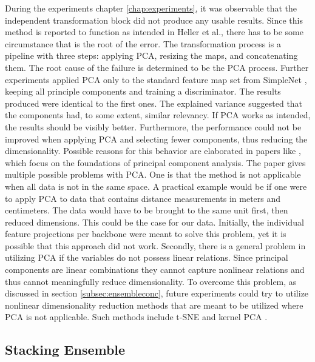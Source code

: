 During the experiments chapter \ref{chap:experiments}, it was observable that the independent transformation block \cite{EnsembleHeller2023} did not produce any usable results. 
Since this method is reported to function as intended in Heller et al., there has to be some circumstance that is the root of the error. The transformation process is a 
pipeline with three steps: applying PCA, resizing the maps, and concatenating them. \newline
The root cause of the failure is determined to be the PCA process. Further experiments applied PCA only to the standard feature map set from SimpleNet \cite{liu2023simplenet}, 
keeping all principle components and training 
a discriminator. The results produced were identical to the first ones. The explained variance suggested that the components had, to some extent, similar relevancy. If PCA 
works as intended, the results should be visibly better. Furthermore, the performance could not be improved when applying PCA and selecting fewer components, thus reducing 
the dimensionality. Possible reasons for this behavior are elaborated in papers like \cite{Jolliffe_2016PCAbasics}, which focus on the foundations of principal component analysis. 
The paper gives multiple possible problems with PCA. One is that the method is not applicable when all data is not in the same space. A practical example would be if one were to 
apply PCA to data that contains distance measurements in meters and centimeters. The data would have to be brought to the same unit first, then reduced dimensions. This could 
be the case for our data. Initially, the individual feature projections per backbone were meant to solve this problem, yet it is possible that this approach did not work. 
Secondly, there is a general problem in utilizing PCA if the variables do not possess linear relations. Since principal components are linear combinations \cite{Jolliffe_2016PCAbasics} 
they cannot capture nonlinear relations and thus cannot meaningfully reduce dimensionality. To overcome this problem, as discussed in section \ref{subsec:ensembleconc}, 
future experiments could try to utilize nonlinear dimensionality reduction methods that are meant to be utilized where PCA is not applicable. Such methods include t-SNE \cite{tSNE} 
and kernel PCA \cite{Hoffmann_2007kernelPCA}.



\subsection{Stacking Ensemble}
\label{subsec:stackingdiscussion}

